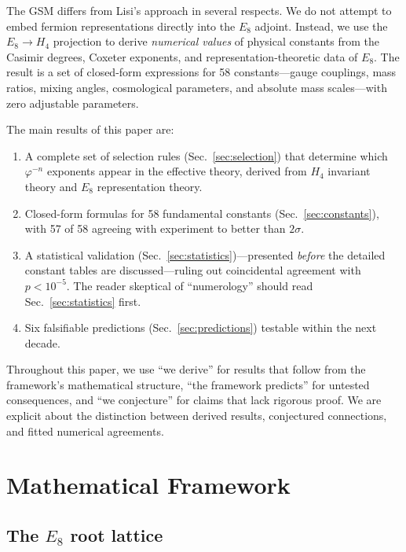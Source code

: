 \documentclass[aps,prd,twocolumn,superscriptaddress,nofootinbib,showpacs]{revtex4-2}
\begin{document}
The GSM differs from Lisi's approach in several respects.  We do not
attempt to embed fermion representations directly into the $E_8$
adjoint.  Instead, we use the $E_8 \to H_4$ projection to derive
\emph{numerical values} of physical constants from the Casimir degrees,
Coxeter exponents, and representation-theoretic data of $E_8$.  The
result is a set of closed-form expressions for 58 constants---gauge
couplings, mass ratios, mixing angles, cosmological parameters, and
absolute mass scales---with zero adjustable parameters.

The main results of this paper are:
\begin{enumerate}
\item A complete set of selection rules (Sec.~\ref{sec:selection})
that determine which $\varphi^{-n}$ exponents appear in the effective
theory, derived from $H_4$ invariant theory and $E_8$ representation
theory.
\item Closed-form formulas for 58 fundamental constants
(Sec.~\ref{sec:constants}), with 57 of 58 agreeing with experiment to
better than $2\sigma$.
\item A statistical validation (Sec.~\ref{sec:statistics})---presented
\emph{before} the detailed constant tables are discussed---ruling out
coincidental agreement with $p < 10^{-5}$.  The reader skeptical of
``numerology'' should read Sec.~\ref{sec:statistics} first.
\item Six falsifiable predictions (Sec.~\ref{sec:predictions})
testable within the next decade.
\end{enumerate}

Throughout this paper, we use ``we derive'' for results that follow
from the framework's mathematical structure, ``the framework predicts''
for untested consequences, and ``we conjecture'' for claims that lack
rigorous proof.  We are explicit about the distinction between derived
results, conjectured connections, and fitted numerical agreements.

\section{Mathematical Framework}\label{sec:framework}

\subsection{The $E_8$ root lattice}\label{sec:e8}
\end{document}
